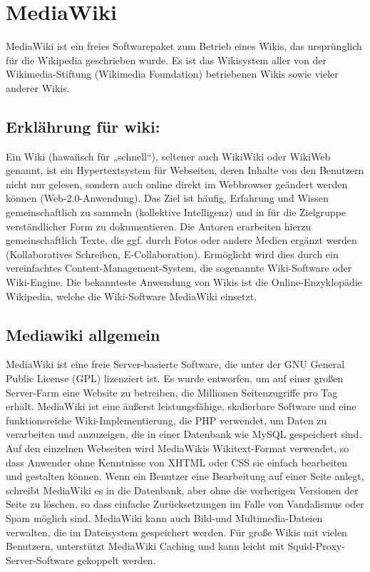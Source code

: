 \section{MediaWiki}
MediaWiki ist ein freies Softwarepaket zum Betrieb eines Wikis, das ursprünglich für die Wikipedia geschrieben wurde. Es ist das Wikisystem aller von der Wikimedia-Stiftung (Wikimedia Foundation) betriebenen Wikis sowie vieler anderer Wikis.
\subsection{Erklährung für wiki:}
Ein Wiki (hawaiisch für „schnell“), seltener auch WikiWiki oder WikiWeb genannt, ist ein Hypertextsystem für Webseiten, deren Inhalte von den Benutzern nicht nur gelesen, sondern auch online direkt im Webbrowser geändert werden können (Web-2.0-Anwendung). Das Ziel ist häufig, Erfahrung und Wissen gemeinschaftlich zu sammeln (kollektive Intelligenz) und in für die Zielgruppe verständlicher Form zu dokumentieren. Die Autoren erarbeiten hierzu gemeinschaftlich Texte, die ggf. durch Fotos oder andere Medien ergänzt werden (Kollaboratives Schreiben, E-Collaboration). Ermöglicht wird dies durch ein vereinfachtes Content-Management-System, die sogenannte Wiki-Software oder Wiki-Engine. Die bekannteste Anwendung von Wikis ist die Online-Enzyklopädie Wikipedia, welche die Wiki-Software MediaWiki einsetzt.

\subsection{Mediawiki allgemein}
MediaWiki ist eine freie Server-basierte Software, die unter der GNU General Public License (GPL) lizenziert ist. Es wurde entworfen, um auf einer großen Server-Farm eine Website zu betreiben, die Millionen Seitenzugriffe pro Tag erhält.
MediaWiki ist eine äußerst leistungsfähige, skalierbare Software und eine funktionsreiche Wiki-Implementierung, die PHP verwendet, um Daten zu verarbeiten und anzuzeigen, die in einer Datenbank wie MySQL gespeichert sind.
Auf den einzelnen Webseiten wird MediaWikis Wikitext-Format verwendet, so dass Anwender ohne Kenntnisse von XHTML oder CSS sie einfach bearbeiten und gestalten können.
Wenn ein Benutzer eine Bearbeitung auf einer Seite anlegt, schreibt MediaWiki es in die Datenbank, aber ohne die vorherigen Versionen der Seite zu löschen, so dass einfache Zurücksetzungen im Falle von Vandalismus oder Spam möglich sind. MediaWiki kann auch Bild-und Multimedia-Dateien verwalten, die im Dateisystem gespeichert werden. Für große Wikis mit vielen Benutzern, unterstützt MediaWiki Caching und kann leicht mit Squid-Proxy-Server-Software gekoppelt werden.

